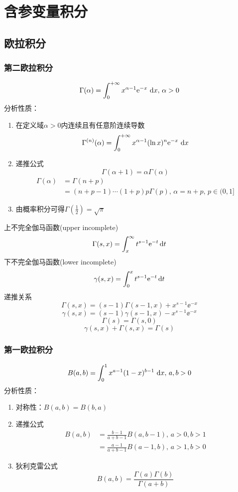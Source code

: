 
\section{含参变量积分}
\subsection{欧拉积分}
\subsubsection{第二欧拉积分}
\[\Gamma(\alpha)=\displaystyle\int_{0}^{+\infty}{x^{\alpha-1}\mathrm{e}^{-x}}\,\,\mathrm{d} x,\,\alpha>0\]
分析性质：
\begin{enumerate}
	\item 在定义域$\alpha>0$内连续且有任意阶连续导数
	\[\Gamma^{(n)}(\alpha)=\displaystyle\int_{0}^{+\infty}{x^{\alpha-1}(\ln x)^n\mathrm{e}^{-x}}\,\,\mathrm{d} x\]
	\item 递推公式
	\[\Gamma(\alpha+1)=\alpha\Gamma(\alpha)\]
	\[\begin{aligned}
	\Gamma(\alpha)&=\Gamma(n+p)\\
	&=(n+p-1)\cdots(1+p)p\Gamma(p),\,\alpha=n+p,\,p\in(0,1]
	\end{aligned}\]
	\item 由概率积分可得$\Gamma(\frac{1}{2})=\sqrt{\pi}$
\end{enumerate}
上不完全伽马函数(upper incomplete)
\[ \Gamma(s,x) = \int_x^{\infty} t^{s-1}\mathrm{e}^{-t}\,\mathrm{d} t\]
下不完全伽马函数(lower incomplete)
\[ \gamma(s,x) = \int_{0}^{x}t^{s-1}\mathrm{e}^{-t}\,\mathrm{d} t\]
递推关系
\[\Gamma(s,x)=(s-1)\Gamma(s-1,x) + x^{s-1} \ee^{-x}\]
\[\gamma(s,x)=(s-1)\gamma(s-1,x) - x^{s-1} \ee^{-x}\]
\[\Gamma(s) = \Gamma(s,0)\]
\[\gamma (s,x)+\Gamma (s,x)=\Gamma (s)\]

\subsubsection{第一欧拉积分}
\[B(a,b)=\displaystyle\int_{0}^{1}{x^{a-1}(1-x)^{b-1}}\,\,\mathrm{d} x,\,a,b>0\]
分析性质：
\begin{enumerate}
	\item 对称性：$B(a,b)=B(b,a)$
	\item 递推公式
	\[\begin{aligned}
	B(a,b)&=\frac{b-1}{a+b-1}B(a,b-1),\,a>0,b>1\\
	&=\frac{a-1}{a+b-1}B(a-1,b),\,a>1,b>0
	\end{aligned}\]
	\item 狄利克雷公式
	\[B(a,b)=\frac{\Gamma(a)\Gamma(b)}{\Gamma(a+b)}\]
\end{enumerate}